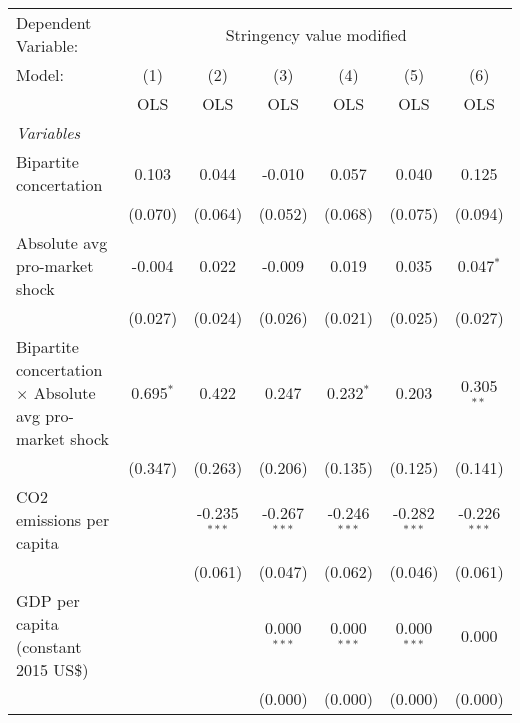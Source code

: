 
\begingroup
\centering
\begin{tabular}{lcccccc}
   \toprule
   Dependent Variable: & \multicolumn{6}{c}{Stringency value modified}\\
   Model:                                                         & (1)         & (2)            & (3)            & (4)            & (5)            & (6)\\  
                                                                  &  OLS        & OLS            & OLS            & OLS            & OLS            & OLS\\  
   \midrule
   \emph{Variables}\\
   Bipartite concertation                                         & 0.103       & 0.044          & -0.010         & 0.057          & 0.040          & 0.125\\   
                                                                  & (0.070)     & (0.064)        & (0.052)        & (0.068)        & (0.075)        & (0.094)\\   
   Absolute avg pro-market shock                                  & -0.004      & 0.022          & -0.009         & 0.019          & 0.035          & 0.047$^{*}$\\   
                                                                  & (0.027)     & (0.024)        & (0.026)        & (0.021)        & (0.025)        & (0.027)\\   
   Bipartite concertation $\times$ Absolute avg pro-market shock  & 0.695$^{*}$ & 0.422          & 0.247          & 0.232$^{*}$    & 0.203          & 0.305$^{**}$\\   
                                                                  & (0.347)     & (0.263)        & (0.206)        & (0.135)        & (0.125)        & (0.141)\\   
   CO2 emissions per capita                                       &             & -0.235$^{***}$ & -0.267$^{***}$ & -0.246$^{***}$ & -0.282$^{***}$ & -0.226$^{***}$\\   
                                                                  &             & (0.061)        & (0.047)        & (0.062)        & (0.046)        & (0.061)\\   
   GDP per capita (constant 2015 US\$)                            &             &                & 0.000$^{***}$  & 0.000$^{***}$  & 0.000$^{***}$  & 0.000\\   
                                                                  &             &                & (0.000)        & (0.000)        & (0.000)        & (0.000)\\   

\end{tabular}
